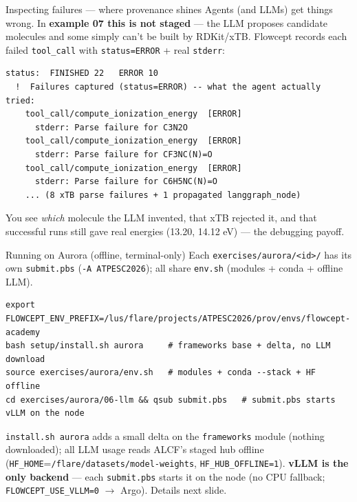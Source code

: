 \documentclass[aspectratio=169,11pt]{beamer}
\begin{document}
\begin{frame}[fragile]{Inspecting failures --- where provenance shines}
  Agents (and LLMs) get things wrong. In \textbf{example 07 this is not staged} ---
  the LLM proposes candidate molecules and some simply \alert{can't be built} by
  RDKit/xTB. Flowcept records each failed \texttt{tool\_call} with
  \textcolor{fcred}{\texttt{status=ERROR}} + real \texttt{stderr}:
\begin{lstlisting}[style=sh]
  status:  FINISHED 22   ERROR 10
  !  Failures captured (status=ERROR) -- what the agent actually tried:
    tool_call/compute_ionization_energy  [ERROR]
      stderr: Parse failure for C3N2O
    tool_call/compute_ionization_energy  [ERROR]
      stderr: Parse failure for CF3NC(N)=O
    tool_call/compute_ionization_energy  [ERROR]
      stderr: Parse failure for C6H5NC(N)=O
    ... (8 xTB parse failures + 1 propagated langgraph_node)
\end{lstlisting}
  \small You see \emph{which} molecule the LLM invented, that xTB rejected it, and that
  successful runs still gave real energies (13.20, 14.12 eV) --- the debugging payoff.
\end{frame}

\begin{frame}[fragile]{Running on Aurora (offline, terminal-only)}
  Each \texttt{exercises/aurora/<id>/} has its own \texttt{submit.pbs}
  (\texttt{-A ATPESC2026}); all share \texttt{env.sh} (modules + conda + offline LLM).
\begin{lstlisting}[style=sh]
export FLOWCEPT_ENV_PREFIX=/lus/flare/projects/ATPESC2026/prov/envs/flowcept-academy
bash setup/install.sh aurora     # frameworks base + delta, no LLM download
source exercises/aurora/env.sh   # modules + conda --stack + HF offline
cd exercises/aurora/06-llm && qsub submit.pbs   # submit.pbs starts vLLM on the node
\end{lstlisting}
  \small \texttt{install.sh aurora} adds a small delta on the \texttt{frameworks} module
  (nothing downloaded); all LLM usage reads ALCF's staged hub offline
  (\texttt{HF\_HOME}=\texttt{/flare/datasets/model-weights}, \texttt{HF\_HUB\_OFFLINE=1}).
  \textbf{vLLM is the only backend} --- each \texttt{submit.pbs} starts it on the node
  (\alert{no CPU fallback}; \texttt{FLOWCEPT\_USE\_VLLM=0} $\to$ Argo). Details next slide.
\end{frame}
\end{document}

